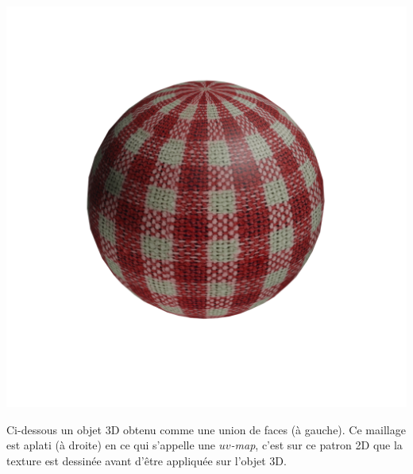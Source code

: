 \documentclass[11pt,class=report,crop=false]{standalone}
\begin{document}
\begin{center}
\includegraphics[scale=\myscale,scale=0.15,trim={3cm 7cm 3cm 7cm},clip]{figures/texture-sphere-coton}
\end{center}



Ci-dessous un objet 3D obtenu comme une union de faces (à gauche).
Ce maillage est aplati (à droite) en ce qui s'appelle une \emph{$uv$-map}, c'est sur ce patron 2D que la texture est dessinée avant d'être appliquée sur l'objet 3D.
\end{document}
